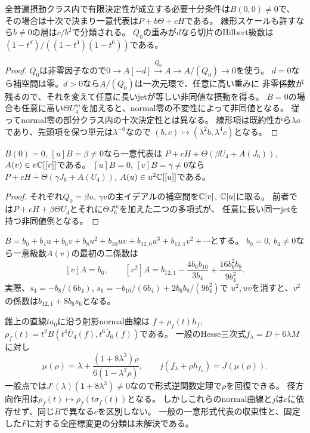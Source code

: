 \begin{corollary}[有限決定性と残る形式moduli]
\label{cor:pf-finite-determinacy-iff}
全普遍摂動クラス内で有限決定性が成立する必要十分条件は$B(0,0)\ne0$で、
その場合は十次で決まり一意代表は$P+b\Theta+cH$である。
線形スケールも許すなら$b\ne0$の層は$c/b^2$で分類される。
$Q_0$の重みが$d$なら切片のHilbert級数は
$(1-t^d)/((1-t^4)(1-t^6))$である。
\end{corollary}
\begin{proof}
$Q_0$は非零因子なので$0\to A[-d]\xrightarrow{Q_0}A\to A/(Q_0)\to0$を使う。
$d=0$なら補空間は零。$d>0$なら$A/(Q_0)$は一次元環で、任意に高い重みに
非零係数が残るので、それを変えて任意に長いjetが等しい非同値な摂動を得る。
$B=0$の場合も任意に高い$\Theta U_4^m$を加えると、normal零の不変性によって非同値となる。
従ってnormal零の部分クラス内の十次決定性とは異なる。
線形項は既約性から$\lambda a$であり、先頭項を保つ単元は$\lambda^{-6}$なので
$(b,c)\mapsto(\lambda^2b,\lambda^4c)$となる。
\end{proof}
\begin{corollary}[一変数の一意な残余級数]
$B(0)=0$, $[u]B=\beta\ne0$なら一意代表は
$P+cH+\Theta(\beta U_4+A(J_6))$, $A(v)\in v\mathbb C[[v]]$である。
$[u]B=0$, $[v]B=\gamma\ne0$なら
$P+cH+\Theta(\gamma J_6+A(U_4))$, $A(u)\in u^2\mathbb C[[u]]$である。
\end{corollary}
\begin{proof}
それぞれ$Q_0=\beta u$, $\gamma v$の主イデアルの補空間を$\mathbb C[v]$, $\mathbb C[u]$に取る。
前者では$P+cH+\beta\Theta U_4$とそれに$\Theta J_6^m$を加えた二つの多項式が、
任意に長い同一jetを持つ非同値例となる。
\end{proof}
\begin{remark}[低い切片係数とnormal曲線が忘れる情報]
$B=b_0+b_4u+b_6v+b_8u^2+b_{10}uv+b_{12,0}u^3+b_{12,1}v^2+\cdots$とする。
$b_0=0$, $b_4\ne0$なら一意級数$A(v)$の最初の二係数は
\[
 [v]A=b_6,\qquad
 [v^2]A=b_{12,1}-\frac{4b_6b_{10}}{3b_4}+\frac{16b_6^2b_8}{9b_4^2}.
\]
実際、$s_4=-b_8/(6b_4)$, $s_6=-b_{10}/(6b_4)+2b_6b_8/(9b_4^2)$で
$u^2,uv$を消すと、$v^2$の係数は$b_{12,1}+8b_6s_6$となる。

錐上の直線$ta_0$に沿う射影normal曲線は
$f+\rho_f(t)h_f$, $\rho_f(t)=t^2B(t^4\overline U_4(f),t^6\overline J_6(f))$である。
一般のHesse三次式$f_\lambda=D+6\lambda M$に対し
\[
 \mu(\rho)=\lambda+\frac{(1+8\lambda^3)\rho}{6(1-\lambda^2\rho)},\qquad
 j(f_\lambda+\rho h_{f_\lambda})=J(\mu(\rho)).
\]
一般点では$J'(\lambda)(1+8\lambda^3)\ne0$なので形式逆関数定理で$\rho$を回復できる。
径方向作用は$\rho_f(t)\mapsto\rho_f(t\sigma_f(t))$となる。
しかしこれらのnormal曲線と$j$は$c$に依存せず、同じ$B$で異なる$c$を区別しない。
一般の一意形式代表の収束性と、固定した$F$に対する全座標変更の分類は未解決である。
\end{remark}
